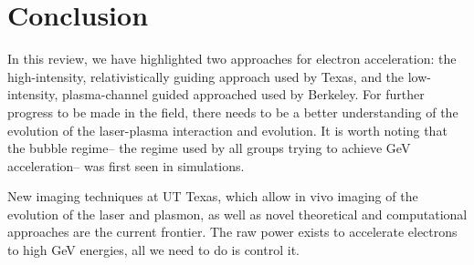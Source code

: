 \documentclass[12pt,letter]{article}
\begin{document}
\section{Conclusion}
In this review, we have highlighted two approaches for electron acceleration:
the high-intensity, relativistically guiding approach used by Texas, and the
low-intensity, plasma-channel guided approached used by Berkeley. For further
progress to be made in the field, there needs to be a better understanding of
the evolution of the laser-plasma interaction and evolution. It is worth noting
that the bubble regime-- the regime used by all groups trying to achieve GeV
acceleration-- was first seen in simulations. 

New imaging techniques at UT Texas, which allow in vivo imaging of the evolution
of the laser and plasmon, as well as novel theoretical and computational
approaches are the current frontier. The raw power exists to accelerate
electrons to high GeV energies, all we need to do is control it.

\end{document}
